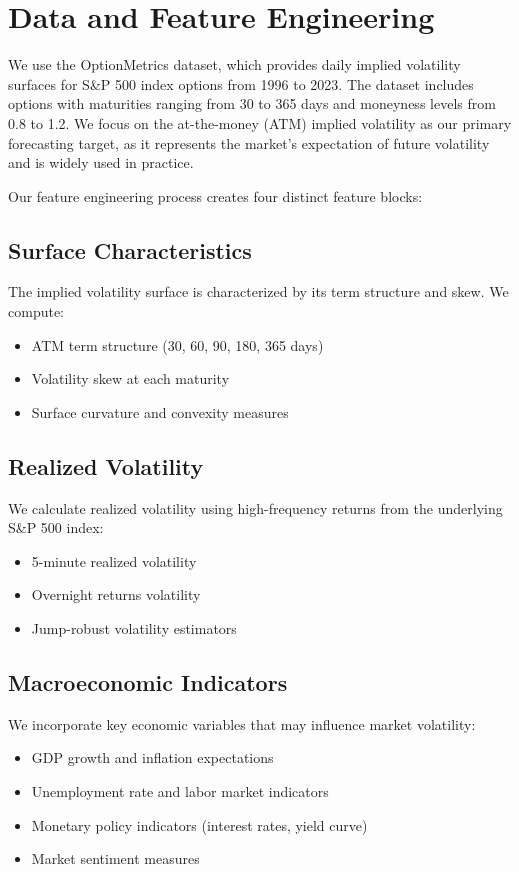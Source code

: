 \documentclass[11pt,a4paper]{article}
\begin{document}
\section{Data and Feature Engineering}
We use the OptionMetrics dataset, which provides daily implied volatility surfaces for S\&P 500 index options from 1996 to 2023. The dataset includes options with maturities ranging from 30 to 365 days and moneyness levels from 0.8 to 1.2. We focus on the at-the-money (ATM) implied volatility as our primary forecasting target, as it represents the market's expectation of future volatility and is widely used in practice.

Our feature engineering process creates four distinct feature blocks:

\subsection{Surface Characteristics}
The implied volatility surface is characterized by its term structure and skew. We compute:
\begin{itemize}
    \item ATM term structure (30, 60, 90, 180, 365 days)
    \item Volatility skew at each maturity
    \item Surface curvature and convexity measures
\end{itemize}

\subsection{Realized Volatility}
We calculate realized volatility using high-frequency returns from the underlying S\&P 500 index:
\begin{itemize}
    \item 5-minute realized volatility
    \item Overnight returns volatility
    \item Jump-robust volatility estimators
\end{itemize}

\subsection{Macroeconomic Indicators}
We incorporate key economic variables that may influence market volatility:
\begin{itemize}
    \item GDP growth and inflation expectations
    \item Unemployment rate and labor market indicators
    \item Monetary policy indicators (interest rates, yield curve)
    \item Market sentiment measures
\end{itemize}
\end{document}

